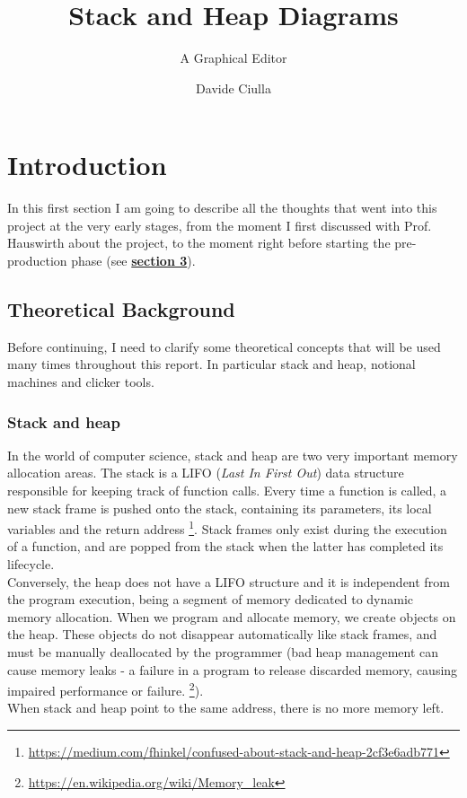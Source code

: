 \documentclass[]{usiinfbachelorproject}
\author{Davide Ciulla}
\title{Stack and Heap Diagrams}
\subtitle{A Graphical Editor}
\begin{document}
\maketitle


\tableofcontents
\newpage


\section{Introduction} \label{introduction}

In this first section I am going to describe all the thoughts that went into this project at the very early stages, from the moment I first discussed with Prof. Hauswirth about the project, to the moment right before starting the pre-production phase (see \hyperref[requirements+analysis]{\textbf{section 3}}).

\subsection{Theoretical Background}

Before continuing, I need to clarify some theoretical concepts that will be used many times throughout this report. In particular stack and heap, notional machines and clicker tools.

\subsubsection{Stack and heap}
In the world of computer science, stack and heap are two very important memory allocation areas. The stack is a LIFO (\emph{Last In First Out}) data structure responsible for keeping track of function calls. Every time a function is called, a new stack frame is pushed onto the stack, containing its parameters, its local variables
 and the return address \footnote{\url{https://medium.com/fhinkel/confused-about-stack-and-heap-2cf3e6adb771}}. Stack frames only exist during the execution of a function, and are popped from the stack when the latter has completed its lifecycle.\\
 Conversely, the heap does not have a LIFO structure and it is independent from the program execution, being a segment of memory dedicated to dynamic memory allocation. When we program and allocate memory, we create objects on the heap. These objects do not disappear automatically like stack frames, and must be manually deallocated by the programmer (bad heap management can cause memory leaks - a failure in a program to release discarded memory, causing impaired performance or failure. \footnote {\url{https://en.wikipedia.org/wiki/Memory_leak}}).\\
 When stack and heap point to the same address, there is no more memory left.
 
\end{document}

